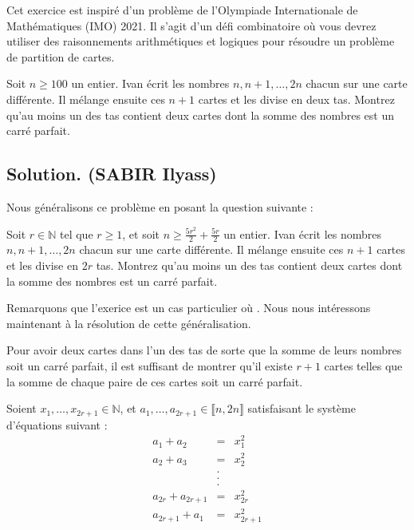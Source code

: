 Cet exercice est inspir{\'e} d'un probl{\`e}me de l'Olympiade Internationale de Math{\'e}matiques (IMO) 2021. Il s'agit d'un d{\'e}fi combinatoire o{\`u} vous devrez utiliser des raisonnements arithm{\'e}tiques et logiques pour r{\'e}soudre un probl{\`e}me de partition de cartes.

\begin{exercise}
Soit $n \geqslant 100$ un entier. Ivan {\'e}crit les nombres $n, n + 1,
\ldots, 2 n$ chacun sur une carte diff{\'e}rente. Il m{\'e}lange ensuite ces
$n + 1$ cartes et les divise en deux tas. Montrez qu'au moins un des tas
contient deux cartes dont la somme des nombres est un carr{\'e} parfait.

\end{exercise}

\subsection*{Solution. (SABIR Ilyass)}


Nous g{\'e}n{\'e}ralisons ce probl{\`e}me en posant la question suivante :


Soit $r \in \mathbb{N}$ tel que $r \geqslant 1$, et soit $n \geqslant \frac{5
r^2}{2} + \frac{5 r}{2}$ un entier. Ivan {\'e}crit les nombres $n, n + 1,
\ldots, 2 n$ chacun sur une carte diff{\'e}rente. Il m{\'e}lange ensuite ces
$n + 1$ cartes et les divise en $2 r$ tas. Montrez qu'au moins un des tas
contient deux cartes dont la somme des nombres est un carr{\'e} parfait.

Remarquons que l'exerice est un cas particulier o{\`u} .
Nous nous int{\'e}ressons maintenant {\`a} la r{\'e}solution de cette
g{\'e}n{\'e}ralisation.

Pour avoir deux cartes dans l'un des tas de sorte que la somme de leurs
nombres soit un carr{\'e} parfait, il est suffisant de montrer qu'il existe $r
+ 1$ cartes telles que la somme de chaque paire de ces cartes soit un
carr{\'e} parfait.

Soient $x_1, \ldots, x_{2 r + 1} \in \mathbb{N}$, et $a_1, \ldots, a_{2 r + 1}
\in \llbracket n, 2 n \rrbracket$ satisfaisant le syst{\`e}me d'{\'e}quations
suivant :
\begin{eqnarray*}
  a_1 + a_2 & = & x_1^2\\
  a_2 + a_3 & = & x^2_2\\
  & . & \\
  & . & \\
  & . & \\
  a_{2 r} + a_{2 r + 1} & = & {x^2_{2 r}} \\
  a_{2 r + 1} + a_1 & = & x^2_{2 r + 1}
\end{eqnarray*}


